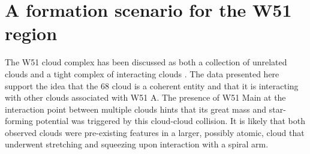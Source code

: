 % 

% 
% 
% 

\section{A formation scenario for the W51 region}
The W51 cloud complex has been discussed as both a collection of unrelated
clouds and a tight complex of interacting clouds \citep{Carpenter1998a,
Kang2010a}.  The \formaldehyde data presented here support the idea that the 68
\kms cloud is a coherent entity and that it is interacting with other clouds
associated with W51 A.  The presence of W51 Main at the interaction point
between multiple clouds hints that its great mass and star-forming potential
was triggered by this cloud-cloud collision.  It is likely that both observed
clouds were pre-existing features in a larger, possibly atomic, cloud that
underwent stretching and squeezing upon interaction with a spiral arm.

